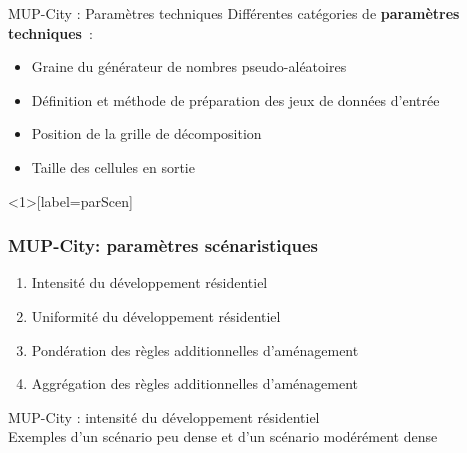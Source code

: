 \documentclass[xcolor=table]{beamer}
\begin{document}
\begin{frame}{MUP-City : Paramètres techniques}
Différentes catégories de \textbf{paramètres techniques}~:\\
\begin{itemize}
	\item Graine du générateur de nombres pseudo-aléatoires
	\item Définition et méthode de préparation des jeux de données d'entrée
	\item Position de la grille de décomposition
	\item Taille des cellules en sortie
\end{itemize}
\end{frame}

\begin{frame}<1>[label=parScen]
\frametitle{MUP-City: paramètres scénaristiques}
	\begin{enumerate}
		\item \alert<1>{Intensité du développement résidentiel}
		\item<2-> \alert<2>{Uniformité du développement résidentiel}
		\item<3-> \alert<3>{Pondération des règles additionnelles d'aménagement}
		\item<4> \alert<4>{Aggrégation des règles additionnelles d'aménagement}
	\end{enumerate}
\end{frame}

\begin{frame}{MUP-City : intensité du développement résidentiel}
	\vspace{1cm}
	\\
	{\footnotesize Exemples d'un scénario peu dense et d'un scénario modérément dense}
\end{frame}
\end{document}
